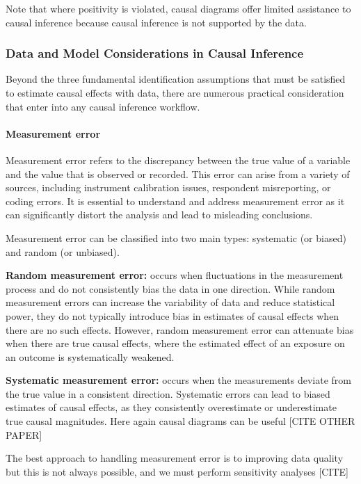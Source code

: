 \documentclass[
  singlecolumn,
  9pt]{article}
\let\oldparagraph\paragraph
\renewcommand{\paragraph}[1]{\oldparagraph{#1}\mbox{}}
\begin{document}
Note that where positivity is violated, causal diagrams offer limited
assistance to causal inference because causal inference is not supported
by the data.

\subsubsection{Data and Model Considerations in Causal
Inference}\label{data-and-model-considerations-in-causal-inference}

Beyond the three fundamental identification assumptions that must be
satisfied to estimate causal effects with data, there are numerous
practical consideration that enter into any causal inference workflow.

\paragraph{Measurement error}\label{measurement-error}

Measurement error refers to the discrepancy between the true value of a
variable and the value that is observed or recorded. This error can
arise from a variety of sources, including instrument calibration
issues, respondent misreporting, or coding errors. It is essential to
understand and address measurement error as it can significantly distort
the analysis and lead to misleading conclusions.

Measurement error can be classified into two main types: systematic (or
biased) and random (or unbiased).

\textbf{Random measurement error:} occurs when fluctuations in the
measurement process and do not consistently bias the data in one
direction. While random measurement errors can increase the variability
of data and reduce statistical power, they do not typically introduce
bias in estimates of causal effects when there are no such effects.
However, random measurement error can attenuate bias when there are true
causal effects, where the estimated effect of an exposure on an outcome
is systematically weakened.

\textbf{Systematic measurement error:} occurs when the measurements
deviate from the true value in a consistent direction. Systematic errors
can lead to biased estimates of causal effects, as they consistently
overestimate or underestimate true causal magnitudes. Here again causal
diagrams can be useful {[}CITE OTHER PAPER{]}

The best approach to handling measurement error is to improving data
quality but this is not always possible, and we must perform sensitivity
analyses {[}CITE{]}
\end{document}
